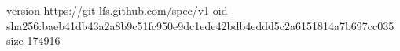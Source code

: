version https://git-lfs.github.com/spec/v1
oid sha256:baeb41db43a2a8b9c51fc950e9dc1ede42bdb4eddd5c2a6151814a7b697cc035
size 174916
